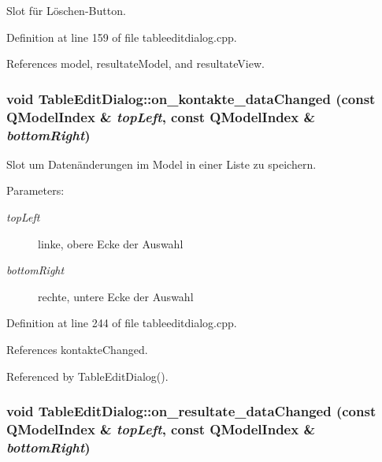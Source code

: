 Slot für Löschen-Button. 



Definition at line 159 of file tableeditdialog.cpp.

References model, resultateModel, and resultateView.\hypertarget{class_table_edit_dialog_24028bd71ab1cee427967807e85e29fe}{
\subsubsection[on\_\-kontakte\_\-dataChanged]{\setlength{\rightskip}{0pt plus 5cm}void TableEditDialog::on\_\-kontakte\_\-dataChanged (const QModelIndex \& {\em topLeft}, \/  const QModelIndex \& {\em bottomRight})}}
\label{class_table_edit_dialog_24028bd71ab1cee427967807e85e29fe}


Slot um Datenänderungen im Model in einer Liste zu speichern. 

\begin{Desc}
\item[Parameters:]
\begin{description}
\item[{\em topLeft}]linke, obere Ecke der Auswahl \item[{\em bottomRight}]rechte, untere Ecke der Auswahl \end{description}
\end{Desc}


Definition at line 244 of file tableeditdialog.cpp.

References kontakteChanged.

Referenced by TableEditDialog().\hypertarget{class_table_edit_dialog_d09fb68dc6ea3de8056d088099db6b67}{
\subsubsection[on\_\-resultate\_\-dataChanged]{\setlength{\rightskip}{0pt plus 5cm}void TableEditDialog::on\_\-resultate\_\-dataChanged (const QModelIndex \& {\em topLeft}, \/  const QModelIndex \& {\em bottomRight})}}
\label{class_table_edit_dialog_d09fb68dc6ea3de8056d088099db6b67}


